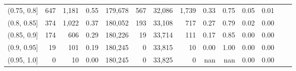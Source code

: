 \begin{tabular}{rrrrrrrrrrrrrr}
(0.75, 0.8]    &     647 &  1,181 &    0.55 &  179,678 &      567 &  32,086 &   1,739 &  0.33 &  0.75 &  0.05 &      0.01 \\
(0.8, 0.85]    &     374 &  1,022 &    0.37 &  180,052 &      193 &  33,108 &     717 &  0.27 &  0.79 &  0.02 &      0.00 \\
(0.85, 0.9]    &     174 &    606 &    0.29 &  180,226 &       19 &  33,714 &     111 &  0.17 &  0.85 &  0.00 &      0.00 \\
(0.9, 0.95]    &      19 &    101 &    0.19 &  180,245 &        0 &  33,815 &      10 &  0.00 &  1.00 &  0.00 &      0.00 \\
(0.95, 1.0]    &       0 &     10 &    0.00 &  180,245 &        0 &  33,825 &       0 &   nan &   nan &  0.00 &      0.00 \\
\bottomrule
\end{tabular}
